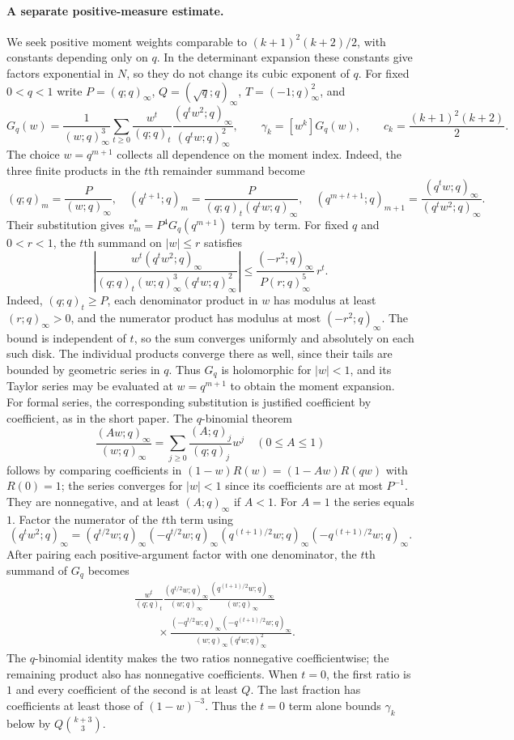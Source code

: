 \documentclass[11pt]{article}
\begin{document}
\paragraph{A separate positive-measure estimate.}
We seek positive moment weights comparable to $(k+1)^2(k+2)/2$,
with constants depending only on $q$. In the determinant expansion
these constants give factors exponential in $N$, so they do not
change its cubic exponent of $q$.
For fixed $0<q<1$ write $P=(q;q)_\infty$, $Q=(\sqrt q;q)_\infty$,
$T=(-1;q)_\infty^2$, and
\[
 G_q(w)=\frac1{(w;q)_\infty^3}\sum_{t\ge0}\frac{w^t}{(q;q)_t}
          \frac{(q^tw^2;q)_\infty}{(q^tw;q)_\infty^2},
 \qquad \gamma_k=[w^k]G_q(w),\qquad c_k=\frac{(k+1)^2(k+2)}2.
\]
The choice $w=q^{m+1}$ collects all dependence on the moment index.
Indeed, the three finite products in the $t$th remainder summand become
\[
 (q;q)_m=\frac{P}{(w;q)_\infty},\quad
 (q^{t+1};q)_m=\frac{P}{(q;q)_t(q^tw;q)_\infty},\quad
 (q^{m+t+1};q)_{m+1}
 =\frac{(q^tw;q)_\infty}{(q^tw^2;q)_\infty}.
\]
Their substitution gives $v_m^*=P^4G_q(q^{m+1})$ term by term.
For fixed $q$ and $0<r<1$, the $t$th summand on $|w|\le r$ satisfies
\[
 \left|\frac{w^t(q^tw^2;q)_\infty}
 {(q;q)_t(w;q)_\infty^3(q^tw;q)_\infty^2}\right|
 \le \frac{(-r^2;q)_\infty}{P(r;q)_\infty^5}\,r^t.
\]
Indeed, $(q;q)_t\ge P$, each denominator product in $w$ has modulus
at least $(r;q)_\infty>0$, and the numerator product has modulus at
most $(-r^2;q)_\infty$. The bound is independent of $t$, so the sum
converges uniformly and absolutely on each such disk. The individual
products converge there as well, since their tails are bounded by
geometric series in $q$. Thus $G_q$ is holomorphic for $|w|<1$,
and its Taylor series may be evaluated at $w=q^{m+1}$ to obtain the
moment expansion. For formal series, the corresponding substitution is
justified coefficient by coefficient, as in the short paper.
The $q$-binomial theorem \cite[Eq.~17.2.37]{dlmf}
\[
 \frac{(Aw;q)_\infty}{(w;q)_\infty}
   =\sum_{j\ge0}\frac{(A;q)_j}{(q;q)_j}w^j\quad(0\le A\le1)
\]
follows by comparing coefficients in
$(1-w)R(w)=(1-Aw)R(qw)$ with $R(0)=1$; the series converges for $|w|<1$
since its coefficients are at most $P^{-1}$.  They are nonnegative, and
at least $(A;q)_\infty$ if $A<1$.  For $A=1$ the series equals $1$.
Factor the numerator of the $t$th term using
\[
 (q^tw^2;q)_\infty=(q^{t/2}w;q)_\infty(-q^{t/2}w;q)_\infty
 (q^{(t+1)/2}w;q)_\infty(-q^{(t+1)/2}w;q)_\infty.
\]
After pairing each positive-argument factor with one denominator,
the $t$th summand of $G_q$ becomes
\[
\begin{aligned}
 &\frac{w^t}{(q;q)_t}
  \frac{(q^{t/2}w;q)_\infty}{(w;q)_\infty}
  \frac{(q^{(t+1)/2}w;q)_\infty}{(w;q)_\infty}\\
 &\qquad{}\times
  \frac{(-q^{t/2}w;q)_\infty(-q^{(t+1)/2}w;q)_\infty}
       {(w;q)_\infty(q^tw;q)_\infty^2}.
\end{aligned}
\]
The $q$-binomial identity makes the two ratios nonnegative
coefficientwise; the remaining product also has nonnegative coefficients.
When $t=0$, the first ratio is $1$ and every coefficient of the second
is at least $Q$. The last fraction has coefficients at least those
of $(1-w)^{-3}$. Thus the $t=0$ term alone bounds $\gamma_k$ below by
$Q\binom{k+3}3$.
\end{document}
